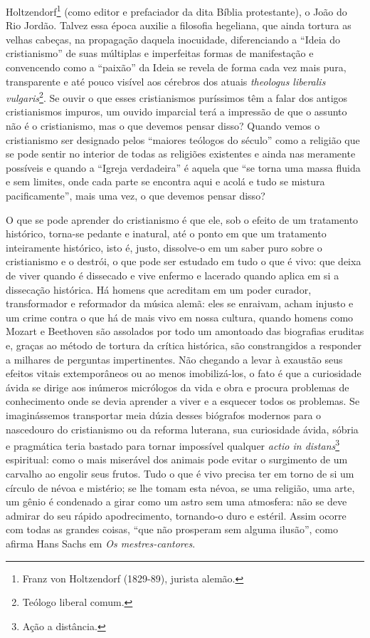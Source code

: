 Holtzendorf\footnote{Franz von Holtzendorf (1829-89), jurista alemão.}
(como editor e prefaciador da dita Bíblia protestante), o João do Rio
Jordão. Talvez essa época auxilie a filosofia hegeliana, que ainda
tortura as velhas cabeças, na propagação daquela inocuidade,
diferenciando a ``Ideia do cristianismo'' de suas múltiplas e
imperfeitas formas de manifestação e convencendo como a ``paixão'' da
Ideia se revela de forma cada vez mais pura, transparente e até pouco
visível aos cérebros dos atuais \emph{theologus liberalis
vulgaris}\footnote{Teólogo liberal comum.}. Se ouvir o que esses
cristianismos puríssimos têm a falar dos antigos cristianismos impuros,
um ouvido imparcial terá a impressão de que o assunto não é o
cristianismo, mas o que devemos pensar disso? Quando vemos o
cristianismo ser designado pelos ``maiores teólogos do século'' como a
religião que se pode sentir no interior de todas as religiões existentes
e ainda nas meramente possíveis e quando a ``Igreja verdadeira'' é
aquela que ``se torna uma massa fluida e sem limites, onde cada parte se
encontra aqui e acolá e tudo se mistura pacificamente'', mais uma vez,
o que devemos pensar disso?

O que se pode aprender do cristianismo é que ele, sob o efeito de um
tratamento histórico, torna-se pedante e inatural, até o ponto em que um
tratamento inteiramente histórico, isto é, justo, dissolve-o em um saber
puro sobre o cristianismo e o destrói, o que pode ser estudado em tudo o
que é vivo: que deixa de viver quando é dissecado e vive enfermo e
lacerado quando aplica em si a dissecação histórica. Há homens que
acreditam em um poder curador, transformador e reformador da música
alemã: eles se enraivam, acham injusto e um crime contra o que há de
mais vivo em nossa cultura, quando homens como Mozart e Beethoven são
assolados por todo um amontoado das biografias eruditas e, graças ao
método de tortura da crítica histórica, são constrangidos a responder a
milhares de perguntas impertinentes. Não chegando a levar à exaustão
seus efeitos vitais extemporâneos ou ao menos imobilizá-los, o fato é
que a curiosidade ávida se dirige aos inúmeros micrólogos da vida e obra
e procura problemas de conhecimento onde se devia aprender a viver e a
esquecer todos os problemas. Se imaginássemos transportar meia dúzia
desses biógrafos modernos para o nascedouro do cristianismo ou da
reforma luterana, sua curiosidade ávida, sóbria e pragmática teria
bastado para tornar impossível qualquer \emph{actio in
distans}\footnote{Ação a distância.} espiritual: como o mais miserável
dos animais pode evitar o surgimento de um carvalho ao engolir seus
frutos. Tudo o que é vivo precisa ter em torno de si um círculo de névoa
e mistério; se lhe tomam esta névoa, se uma religião, uma arte, um gênio
é condenado a girar como um astro sem uma atmosfera: não se deve admirar
do seu rápido apodrecimento, tornando-o duro e estéril. Assim ocorre com
todas as grandes coisas, ``que não prosperam sem alguma ilusão'', como
afirma Hans Sachs em \emph{Os mestres-cantores}.

